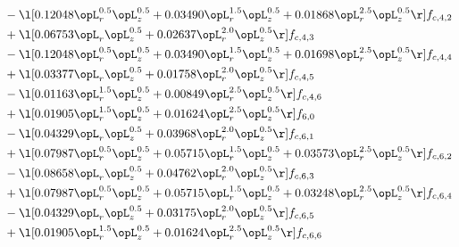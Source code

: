 \begin{alignat}{2}
& - \l[  0.12048 \opL_r^{0.5} \opL_z^{0.5} +  0.03490 \opL_r^{1.5} \opL_z^{0.5} +  0.01868 \opL_r^{2.5} \opL_z^{0.5}  \r] f_{c,4,2} \nonumber \\ 
& + \l[  0.06753 \opL_r \opL_z^{0.5} +  0.02637 \opL_r^{2.0} \opL_z^{0.5}  \r] f_{c,4,3} \nonumber \\ 
& - \l[  0.12048 \opL_r^{0.5} \opL_z^{0.5} +  0.03490 \opL_r^{1.5} \opL_z^{0.5} +  0.01698 \opL_r^{2.5} \opL_z^{0.5}  \r] f_{c,4,4} \nonumber \\ 
& + \l[  0.03377 \opL_r \opL_z^{0.5} +  0.01758 \opL_r^{2.0} \opL_z^{0.5}  \r] f_{c,4,5} \nonumber \\ 
& - \l[  0.01163 \opL_r^{1.5} \opL_z^{0.5} +  0.00849 \opL_r^{2.5} \opL_z^{0.5}  \r] f_{c,4,6} \nonumber \\ 
& + \l[  0.01905 \opL_r^{1.5} \opL_z^{0.5} +  0.01624 \opL_r^{2.5} \opL_z^{0.5}  \r] f_{6,0} \nonumber \\ 
& - \l[  0.04329 \opL_r \opL_z^{0.5} +  0.03968 \opL_r^{2.0} \opL_z^{0.5}  \r] f_{c,6,1} \nonumber \\ 
& + \l[  0.07987 \opL_r^{0.5} \opL_z^{0.5} +  0.05715 \opL_r^{1.5} \opL_z^{0.5} +  0.03573 \opL_r^{2.5} \opL_z^{0.5}  \r] f_{c,6,2} \nonumber \\ 
& - \l[  0.08658 \opL_r \opL_z^{0.5} +  0.04762 \opL_r^{2.0} \opL_z^{0.5}  \r] f_{c,6,3} \nonumber \\ 
& + \l[  0.07987 \opL_r^{0.5} \opL_z^{0.5} +  0.05715 \opL_r^{1.5} \opL_z^{0.5} +  0.03248 \opL_r^{2.5} \opL_z^{0.5}  \r] f_{c,6,4} \nonumber \\ 
& - \l[  0.04329 \opL_r \opL_z^{0.5} +  0.03175 \opL_r^{2.0} \opL_z^{0.5}  \r] f_{c,6,5} \nonumber \\ 
& + \l[  0.01905 \opL_r^{1.5} \opL_z^{0.5} +  0.01624 \opL_r^{2.5} \opL_z^{0.5}  \r] f_{c,6,6} \nonumber \\ 
\end{alignat} 


